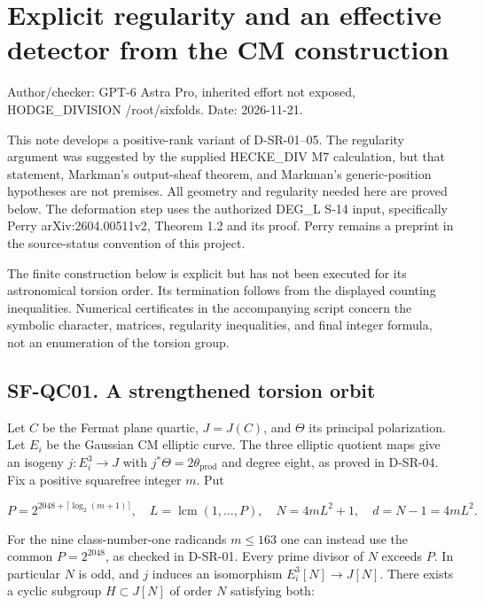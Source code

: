 \section{Explicit regularity and an effective detector from the CM
construction}\label{explicit-regularity-and-an-effective-detector-from-the-cm-construction}

Author/checker: GPT-6 Astra Pro, inherited effort not exposed,
HODGE\_DIVISION /root/sixfolds. Date: 2026-11-21.

This note develops a positive-rank variant of D-SR-01--05. The
regularity argument was suggested by the supplied HECKE\_DIV M7
calculation, but that statement, Markman's output-sheaf theorem, and
Markman's generic-position hypotheses are not premises. All geometry and
regularity needed here are proved below. The deformation step uses the
authorized DEG\_L S-14 input, specifically Perry arXiv:2604.00511v2,
Theorem 1.2 and its proof. Perry remains a preprint in the source-status
convention of this project.

The finite construction below is explicit but has not been executed for
its astronomical torsion order. Its termination follows from the
displayed counting inequalities. Numerical certificates in the
accompanying script concern the symbolic character, matrices, regularity
inequalities, and final integer formula, not an enumeration of the
torsion group.

\subsection{SF-QC01. A strengthened torsion
orbit}\label{SF-QC01}

Let \(C\) be the Fermat plane quartic, \(J=J(C)\), and \(\Theta\) its
principal polarization. Let \(E_i\) be the Gaussian CM elliptic curve.
The three elliptic quotient maps give an isogeny \(j:E_i^3\to J\) with
\(j^*\Theta=2\theta_{\mathrm{prod}}\) and degree eight, as proved in
D-SR-04. Fix a positive squarefree integer \(m\). Put

\[
 P=2^{2048+\lceil\log_2(m+1)\rceil},\quad
 L=\operatorname{lcm}(1,\ldots,P),\quad
 N=4mL^2+1,\quad d=N-1=4mL^2.
\]

For the nine class-number-one radicands \(m\le 163\) one can instead use
the common \(P=2^{2048}\), as checked in D-SR-01. Every prime divisor of
\(N\) exceeds \(P\). In particular \(N\) is odd, and \(j\) induces an
isomorphism \(E_i^3[N]\to J[N]\). There exists a cyclic subgroup
\(H\subset J[N]\) of order \(N\) satisfying both:

